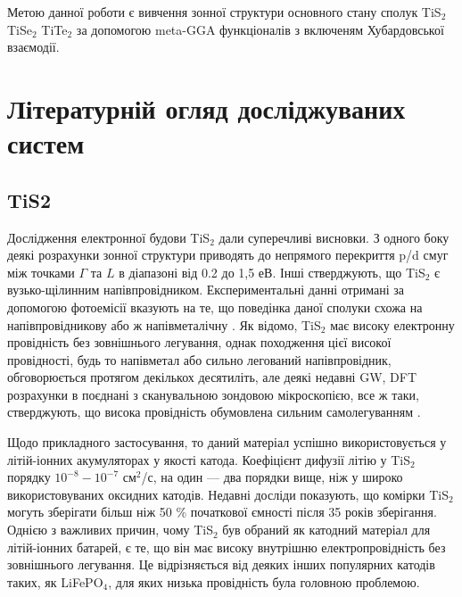 Метою данної роботи є вивчення зонної структури основного стану сполук TiS$_2$ TiSe$_2$ TiTe$_2$ за допомогою meta-GGA функціоналів з включеням Хубардовської взаємодії. 

\section{Літературній огляд досліджуваних систем}
\subsection{TiS2}
Дослідження електронної будови TiS$_{2}$ дали суперечливі висновки. З одного боку деякі розрахунки зонної структури приводять до непрямого перекриття p/d смуг між точками $\Gamma$ та $L$ в діапазоні від 0.2 до 1,5 еВ. Інші стверджують, що TiS$_{2}$ є вузько-щілинним напівпровідником. Експериментальні данні отримані за допомогою фотоемісії вказують на те, що поведінка даної сполуки схожа на напівпровідникову \cite{semiconducter} або ж напівметалічну \cite{semimetal}. Як відомо, TiS$_{2}$ має високу електронну провідність без зовнішнього легування, однак походження цієї високої провідності, будь то напівметал або сильно легований напівпровідник, обговорюється протягом декількох десятиліть, але деякі недавні GW, DFT розрахунки в поєднані з сканувальною зондовою мікроскопією, все ж таки, стверджують, що висока провідність обумовлена сильним самолегуванням \cite{semimetal_or_semiconducter}. 

Щодо прикладного застосування, то даний матеріал успішно використовується у літій-іонних акумуляторах у якості катода. Коефіцієнт дифузії літію у TiS$_2$ порядку $10^{-8}-10^{-7}$ см$^2$/с, на один --- два порядки вище, ніж у широко використовуваних оксидних катодів. Недавні досліди показують, що комірки TiS$_2$ могуть зберігати більш ніж 50 \% початкової ємності після 35 років зберігання. Однією з важливих причин, чому TiS$_2$ був обраний як катодний матеріал для літій-іонних батарей, є те, що він має високу внутрішню електропровідність без зовнішнього легування. Це відрізняється від деяких інших популярних катодів таких, як LiFePO$_4$, для яких низька провідність була головною проблемою.

